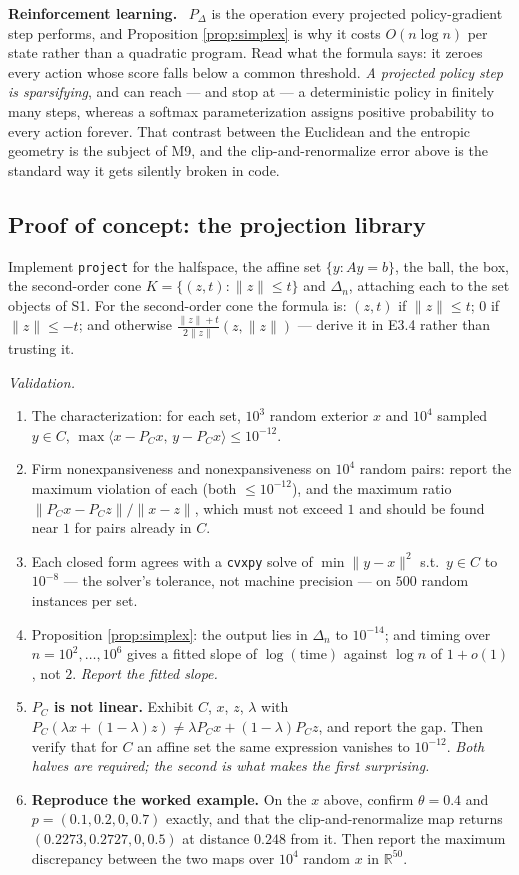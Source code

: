 \documentclass[11pt,a4paper]{article}
\newcommand{\mpart}[1]{\smallskip\noindent\textbf{#1}\ \ignorespaces}
\theoremstyle{definition}
\theoremstyle{plain}
\theoremstyle{remark}
\newcommand{\R}{\mathbb{R}}
\newcommand{\ip}[2]{\langle #1,\, #2\rangle}
\newcommand{\norm}[1]{\lVert #1\rVert}
\newcommand{\proj}{P}
\newcommand{\Simplex}{\Delta}
\begin{document}
\mpart{Reinforcement learning.} $\proj_\Simplex$ is the operation every projected
policy-gradient step performs, and Proposition \ref{prop:simplex} is why it costs $O(n\log n)$
per state rather than a quadratic program. Read what the formula says: it zeroes every action
whose score falls below a common threshold. \emph{A projected policy step is sparsifying}, and
can reach --- and stop at --- a deterministic policy in finitely many steps, whereas a softmax
parameterization assigns positive probability to every action forever. That contrast between
the Euclidean and the entropic geometry is the subject of M9, and the clip-and-renormalize error
above is the standard way it gets silently broken in code.

\subsection*{Proof of concept: the projection library}

Implement \texttt{project} for the halfspace, the affine set $\{y:Ay=b\}$, the ball, the box,
the second-order cone $K=\{(z,t):\norm z\le t\}$ and $\Simplex_n$, attaching each to the set
objects of S1. For the second-order cone the formula is: $(z,t)$ if $\norm z\le t$; $0$ if
$\norm z\le-t$; and otherwise $\frac{\norm z+t}{2\norm z}(z,\norm z)$ --- derive it in E3.4
rather than trusting it.

\emph{Validation.}
\begin{enumerate}
\item The characterization: for each set, $10^3$ random exterior $x$ and $10^4$ sampled
$y\in C$, $\max\ip{x-\proj_Cx}{y-\proj_Cx}\le10^{-12}$.
\item Firm nonexpansiveness and nonexpansiveness on $10^4$ random pairs: report the maximum
violation of each (both $\le10^{-12}$), and the maximum ratio
$\norm{\proj_Cx-\proj_Cz}/\norm{x-z}$, which must not exceed $1$ and should be found near $1$
for pairs already in $C$.
\item Each closed form agrees with a \texttt{cvxpy} solve of $\min\norm{y-x}^2$ s.t.\ $y\in C$
to $10^{-8}$ --- the solver's tolerance, not machine precision --- on $500$ random instances per
set.
\item Proposition \ref{prop:simplex}: the output lies in $\Simplex_n$ to $10^{-14}$; and
timing over $n=10^2,\dots,10^6$ gives a fitted slope of $\log(\text{time})$ against $\log n$ of
$1+o(1)$, not $2$. \emph{Report the fitted slope.}
\item \textbf{$\proj_C$ is not linear.} Exhibit $C$, $x$, $z$, $\lambda$ with
$\proj_C(\lambda x+(1-\lambda)z)\ne\lambda\proj_Cx+(1-\lambda)\proj_Cz$, and report the gap.
Then verify that for $C$ an affine set the same expression vanishes to $10^{-12}$. \emph{Both
halves are required; the second is what makes the first surprising.}
\item \textbf{Reproduce the worked example.} On the $x$ above, confirm $\theta=0.4$ and
$p=(0.1,0.2,0,0.7)$ exactly, and that the clip-and-renormalize map returns
$(0.2273,0.2727,0,0.5)$ at distance $0.248$ from it. Then report the maximum discrepancy between
the two maps over $10^4$ random $x$ in $\R^{50}$.
\end{enumerate}
\end{document}
